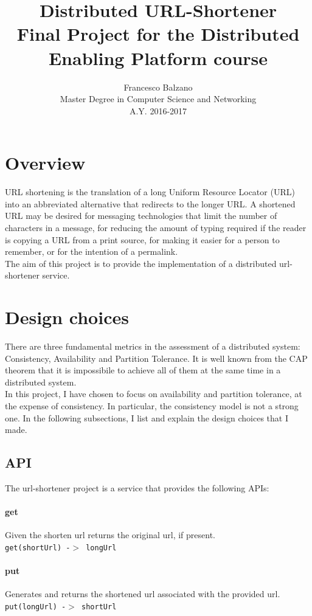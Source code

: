 \documentclass{article}
\title{ \textbf {\vspace{0.5cm}\Huge Distributed URL-Shortener \\}
 Final Project for the Distributed Enabling Platform course \vspace{15.0cm}\\}
\date{\vspace{2cm}}
\author{ \Large Francesco Balzano \vspace{0.3cm}\\ 
\Large Master Degree in Computer Science and Networking \vspace{0.4cm} \\
\Large A.Y. 2016-2017 
}
\begin{document}
  \maketitle
  \newpage
  \tableofcontents
  \newpage
  
\section{Overview}  
URL shortening is the translation of a long Uniform Resource Locator (URL) into an abbreviated alternative that redirects to the longer URL.  A shortened URL may be desired for messaging technologies that limit the number of characters in a message, for reducing the amount of typing required if the reader is copying a URL from a print source, for making it easier for a person to remember, or for the intention of a permalink.\\  
The aim of this project is to provide the implementation of a distributed url-shortener service.


\section{Design choices}
There are three fundamental metrics in the assessment of a distributed system: Consistency, Availability and Partition Tolerance. It is well known from the CAP theorem that it is impossibile to achieve all of them at the same time in a distributed system. \\ 
In this project, I have chosen to focus on availability and partition tolerance, at the expense of consistency. In particular, the consistency model is not a strong one.
In the following subsections, I list and explain the design choices that I made.


\subsection{API}
The url-shortener project is a service that provides the following APIs:

\paragraph{get}
Given the shorten url returns the original url, if present. \\
\texttt{get(shortUrl) -$>$ longUrl}

\paragraph{put}
Generates and returns the shortened url associated with the provided url. \\
\texttt{put(longUrl) -$>$  shortUrl}
\end{document}
